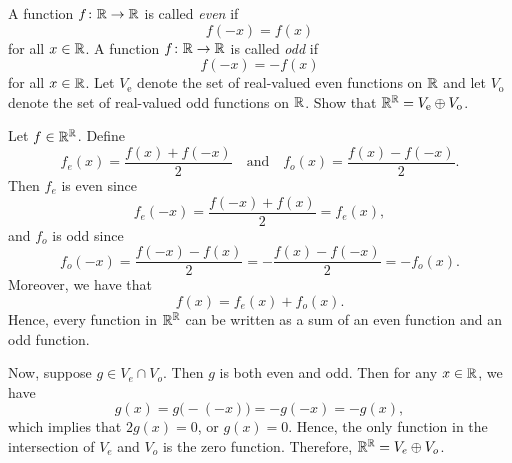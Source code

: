 \begin{exc}
\begin{exercise}
A function $f\colon\mathbb{R}\to\mathbb{R}$ is called \emph{even} if
\[ f(-x) = f(x) \]
for all $x\in\mathbb{R}$. A function $f\colon\mathbb{R}\to\mathbb{R}$ is called \emph{odd} if
\[ f(-x) = -f(x) \]
for all $x\in\mathbb{R}$. Let $V_{\mathrm{e}}$ denote the set of real-valued even
functions on $\mathbb{R}$ and let $V_{\mathrm{o}}$ denote the set of real-valued odd
functions on $\mathbb{R}$. Show that $\mathbb{R}^{\mathbb{R}}=V_{\mathrm{e}}\oplus V_{\mathrm{o}}$.
\end{exercise}
\begin{solution}
Let $f\in\mathbb{R}^{\mathbb{R}}$. Define
\[ f_e(x) = \frac{f(x)+f(-x)}{2} \quad\text{and}\quad
   f_o(x) = \frac{f(x)-f(-x)}{2}. \]
Then $f_e$ is even since
\[ f_e(-x) = \frac{f(-x)+f(x)}{2} = f_e(x), \]
and $f_o$ is odd since
\[ f_o(-x) = \frac{f(-x)-f(x)}{2} = -\frac{f(x)-f(-x)}{2} = -f_o(x). \]
Moreover, we have that
\[ f(x) = f_e(x)+f_o(x). \]
Hence, every function in $\mathbb{R}^{\mathbb{R}}$ can be written as a sum of an even function
and an odd function.

Now, suppose $g\in V_e\cap V_o$. Then $g$ is both even and odd. Then for any
$x\in\mathbb{R}$, we have
\[ g(x) = g\bigl(-(-x)\bigr) = -g(-x) = -g(x), \]
which implies that $2g(x)=0$, or $g(x)=0$. Hence, the only function in the
intersection of $V_e$ and $V_o$ is the zero function. Therefore,
$\mathbb{R}^{\mathbb{R}}=V_e\oplus V_o$.
\end{solution}
\end{exc}
